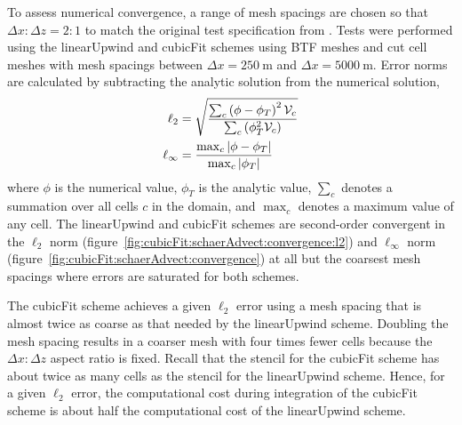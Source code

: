 To assess numerical convergence, a range of mesh spacings are chosen so that $\Delta x \mathbin{:} \Delta z = 2\mathbin{:}1$ to match the original test specification from \citet{schaer2002}.
Tests were performed using the linearUpwind and cubicFit schemes using BTF meshes and cut cell meshes with mesh spacings between $\Delta x = \SI{250}{\meter}$ and $\Delta x = \SI{5000}{\meter}$.
Error norms are calculated by subtracting the analytic solution from the numerical solution,
\begin{align}
	\ell_2 &= \sqrt{\frac{\sum_c \left(\phi - \phi_T \right)^2 \mathcal{V}_c}{\sum_c \left(\phi_T^2 \mathcal{V}_c \right)}} \label{eqn:l2-error} \\
	\ell_\infty &= \frac{\max_c \left\lvert \phi - \phi_T \right\rvert}{\max_c \left\lvert \phi_T \right\rvert} \label{eqn:linf-error}
\end{align}
where $\phi$ is the numerical value, $\phi_T$ is the analytic value, $\sum_c$ denotes a summation over all cells $c$ in the domain, and $\max_c$ denotes a maximum value of any cell.
The linearUpwind and cubicFit schemes are second-order convergent in the $\ell_2$ norm (figure~\ref{fig:cubicFit:schaerAdvect:convergence:l2}) and $\ell_\infty$ norm (figure~\ref{fig:cubicFit:schaerAdvect:convergence}) at all but the coarsest mesh spacings where errors are saturated for both schemes.

The cubicFit scheme achieves a given $\ell_2$ error using a mesh spacing that is almost twice as coarse as that needed by the linearUpwind scheme.  Doubling the mesh spacing results in a coarser mesh with four times fewer cells because the $\Delta x \mathbin{:} \Delta z$ aspect ratio is fixed.
Recall that the stencil for the cubicFit scheme has about twice as many cells as the stencil for the linearUpwind scheme.
Hence, for a given $\ell_2$ error, the computational cost during integration of the cubicFit scheme is about half the computational cost of the linearUpwind scheme.


